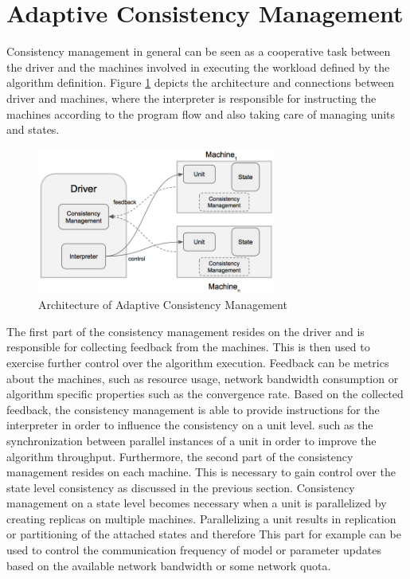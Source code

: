 \section{Adaptive Consistency Management}
Consistency management in general can be seen as a cooperative task between the driver and the machines involved in executing the workload defined by the algorithm definition.
Figure \ref{fig:adapt_consist_mgmt} depicts the architecture and connections between driver and machines, where the interpreter is responsible for instructing the machines according to the program flow and also taking care of managing units and states.
\begin{figure}[ht]
\centering
\includegraphics[width=0.7\textwidth]{img/adapt_consist_mgmt.png}
\caption{Architecture of Adaptive Consistency Management}
\label{fig:adapt_consist_mgmt}
\end{figure}
The first part of the consistency management resides on the driver and is responsible for collecting feedback from the machines.
This is then used to exercise further control over the algorithm execution.
Feedback can be metrics about the machines, such as resource usage, network bandwidth consumption or algorithm specific properties such as the convergence rate.
Based on the collected feedback, the consistency management is able to provide instructions for the interpreter in order to influence the consistency on a unit level.
such as the synchronization between parallel instances of a unit in order to improve the algorithm throughput.
Furthermore, the second part of the consistency management resides on each machine.
This is necessary to gain control over the state level consistency as discussed in the previous section.
Consistency management on a state level becomes necessary when a unit is parallelized by creating replicas on multiple machines.
Parallelizing a unit results in replication or partitioning of the attached states and therefore
This part for example can be used to control the communication frequency of model or parameter updates based on the available network bandwidth or some network quota.
